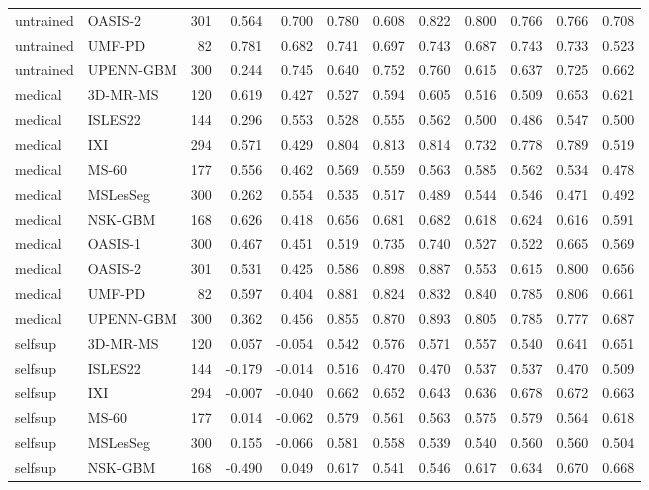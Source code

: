 \begin{tabular}{llrrrrrrrrrr}
untrained & OASIS-2 & 301 & 0.564 & 0.700 & 0.780 & 0.608 & 0.822 & 0.800 & 0.766 & 0.766 & 0.708 \\
untrained & UMF-PD & 82 & 0.781 & 0.682 & 0.741 & 0.697 & 0.743 & 0.687 & 0.743 & 0.733 & 0.523 \\
untrained & UPENN-GBM & 300 & 0.244 & 0.745 & 0.640 & 0.752 & 0.760 & 0.615 & 0.637 & 0.725 & 0.662 \\
medical & 3D-MR-MS & 120 & 0.619 & 0.427 & 0.527 & 0.594 & 0.605 & 0.516 & 0.509 & 0.653 & 0.621 \\
medical & ISLES22 & 144 & 0.296 & 0.553 & 0.528 & 0.555 & 0.562 & 0.500 & 0.486 & 0.547 & 0.500 \\
medical & IXI & 294 & 0.571 & 0.429 & 0.804 & 0.813 & 0.814 & 0.732 & 0.778 & 0.789 & 0.519 \\
medical & MS-60 & 177 & 0.556 & 0.462 & 0.569 & 0.559 & 0.563 & 0.585 & 0.562 & 0.534 & 0.478 \\
medical & MSLesSeg & 300 & 0.262 & 0.554 & 0.535 & 0.517 & 0.489 & 0.544 & 0.546 & 0.471 & 0.492 \\
medical & NSK-GBM & 168 & 0.626 & 0.418 & 0.656 & 0.681 & 0.682 & 0.618 & 0.624 & 0.616 & 0.591 \\
medical & OASIS-1 & 300 & 0.467 & 0.451 & 0.519 & 0.735 & 0.740 & 0.527 & 0.522 & 0.665 & 0.569 \\
medical & OASIS-2 & 301 & 0.531 & 0.425 & 0.586 & 0.898 & 0.887 & 0.553 & 0.615 & 0.800 & 0.656 \\
medical & UMF-PD & 82 & 0.597 & 0.404 & 0.881 & 0.824 & 0.832 & 0.840 & 0.785 & 0.806 & 0.661 \\
medical & UPENN-GBM & 300 & 0.362 & 0.456 & 0.855 & 0.870 & 0.893 & 0.805 & 0.785 & 0.777 & 0.687 \\
selfsup & 3D-MR-MS & 120 & 0.057 & -0.054 & 0.542 & 0.576 & 0.571 & 0.557 & 0.540 & 0.641 & 0.651 \\
selfsup & ISLES22 & 144 & -0.179 & -0.014 & 0.516 & 0.470 & 0.470 & 0.537 & 0.537 & 0.470 & 0.509 \\
selfsup & IXI & 294 & -0.007 & -0.040 & 0.662 & 0.652 & 0.643 & 0.636 & 0.678 & 0.672 & 0.663 \\
selfsup & MS-60 & 177 & 0.014 & -0.062 & 0.579 & 0.561 & 0.563 & 0.575 & 0.579 & 0.564 & 0.618 \\
selfsup & MSLesSeg & 300 & 0.155 & -0.066 & 0.581 & 0.558 & 0.539 & 0.540 & 0.560 & 0.560 & 0.504 \\
selfsup & NSK-GBM & 168 & -0.490 & 0.049 & 0.617 & 0.541 & 0.546 & 0.617 & 0.634 & 0.670 & 0.668 \\

\end{tabular}
